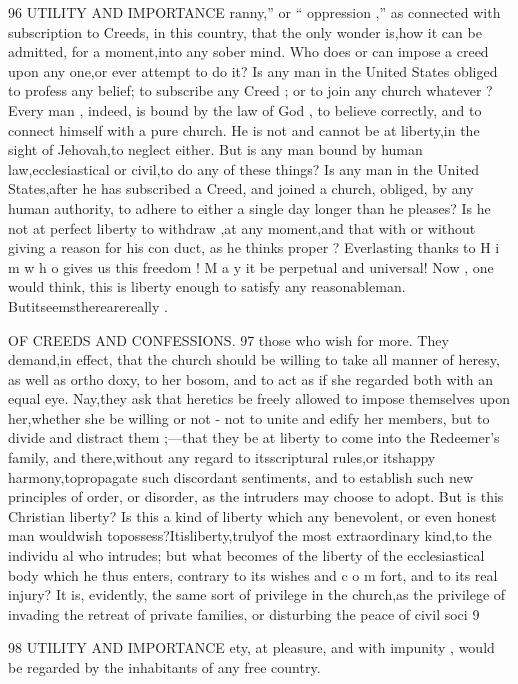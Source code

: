 \documentclass[
]{book}
\begin{document}
96 UTILITY AND IMPORTANCE
ranny,'' or `` oppression ,'' as connected with
subscription to Creeds, in this country, that
the only wonder is,how it can be admitted, for a moment,into any sober mind. Who
does or can impose a creed upon any one,or ever attempt to do it? Is any man in the
United States obliged to profess any belief; to subscribe any Creed ; or to join any church
whatever ? Every man , indeed, is bound by the law of God , to believe correctly, and to connect himself with a pure church. He is
not and cannot be at liberty,in the sight of
Jehovah,to neglect either. But is any man
bound by human law,ecclesiastical or civil,to
do any of these things? Is any man in the
United States,after he has subscribed a Creed,
and joined a church, obliged, by any human
authority, to adhere to either a single day
longer than he pleases? Is he not at perfect
liberty to withdraw ,at any moment,and that
with or without giving a reason for his con duct, as he thinks proper ? Everlasting thanks
to H i m w h o gives us this freedom ! M a y it be perpetual and universal! Now , one would
think, this is liberty enough to satisfy any reasonableman. Butitseemstherearereally
.

OF CREEDS AND CONFESSIONS. 97
those who wish for more. They demand,in effect, that the church should be willing to
take all manner of heresy, as well as ortho doxy, to her bosom, and to act as if she
regarded both with an equal eye. Nay,they ask that heretics be freely allowed to impose
themselves upon her,whether she be willing or not - not to unite and edify her members, but to divide and distract them ;---that they be
at liberty to come into the Redeemer's family, and there,without any regard to itsscriptural
rules,or itshappy harmony,topropagate such discordant sentiments, and to establish such new principles of order, or disorder, as the intruders may choose to adopt. But is this Christian liberty? Is this a kind of liberty which any benevolent, or even honest man wouldwish topossess?Itisliberty,trulyof the most extraordinary kind,to the individu al who intrudes; but what becomes of the liberty of the ecclesiastical body which he thus enters, contrary to its wishes and c o m fort, and to its real injury? It is, evidently, the same sort of privilege in the church,as the privilege of invading the retreat of private families, or disturbing the peace of civil soci
9

98 UTILITY AND IMPORTANCE
ety, at pleasure, and with impunity , would be regarded by the inhabitants of any free country.
\end{document}
